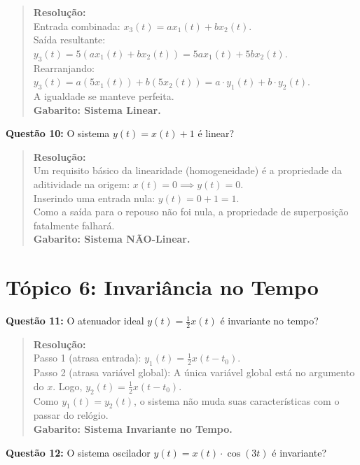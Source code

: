 \begin{quote}
\textbf{Resolução:}\\
Entrada combinada: \(x_3(t) = ax_1(t) + bx_2(t)\).\\
Saída resultante: \(y_3(t) = 5(ax_1(t) + bx_2(t)) = 5ax_1(t) + 5bx_2(t)\).\\
Rearranjando: \(y_3(t) = a(5x_1(t)) + b(5x_2(t)) = a \cdot y_1(t) + b \cdot y_2(t)\).\\
A igualdade se manteve perfeita.\\
\textbf{Gabarito: Sistema Linear.}
\end{quote}

\textbf{Questão 10:} O sistema \(y(t) = x(t) + 1\) é linear?

\begin{quote}
\textbf{Resolução:}\\
Um requisito básico da linearidade (homogeneidade) é a propriedade da aditividade na origem: \(x(t) = 0 \implies y(t) = 0\).\\
Inserindo uma entrada nula: \(y(t) = 0 + 1 = 1\).\\
Como a saída para o repouso não foi nula, a propriedade de superposição fatalmente falhará.\\
\textbf{Gabarito: Sistema NÃO-Linear.}
\end{quote}

\section{Tópico 6: Invariância no Tempo}\label{tuxf3pico-6-invariuxe2ncia-no-tempo}

\textbf{Questão 11:} O atenuador ideal \(y(t) = \frac{1}{2}x(t)\) é invariante no tempo?

\begin{quote}
\textbf{Resolução:}\\
Passo 1 (atrasa entrada): \(y_1(t) = \frac{1}{2}x(t-t_0)\).\\
Passo 2 (atrasa variável global): A única variável global está no argumento do \(x\). Logo, \(y_2(t) = \frac{1}{2}x(t-t_0)\).\\
Como \(y_1(t) = y_2(t)\), o sistema não muda suas características com o passar do relógio.\\
\textbf{Gabarito: Sistema Invariante no Tempo.}
\end{quote}

\textbf{Questão 12:} O sistema oscilador \(y(t) = x(t) \cdot \cos(3t)\) é invariante?

